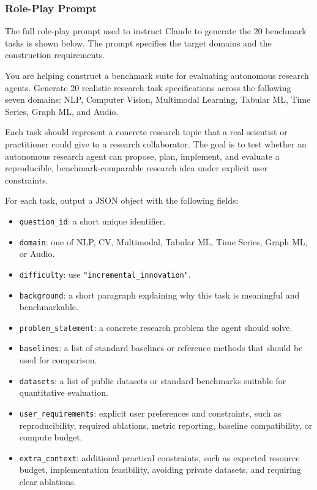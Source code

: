 \documentclass{opendatalab}
\begin{document}
\subsubsection{Role-Play Prompt}
\label{sec:benchmark_prompt}

The full role-play prompt used to instruct Claude to generate the 20
benchmark tasks is shown below. The prompt specifies the target
domains and the construction requirements.

\begin{tcolorbox}[
  breakable,
  colback=gray!5,
  colframe=black!60,
  boxrule=0.5pt,
  arc=2pt,
  left=6pt, right=6pt, top=6pt, bottom=6pt,
  title=\textbf{Role-play prompt for benchmark topic generation},
  fonttitle=\small\bfseries
]
\small
You are helping construct a benchmark suite for evaluating autonomous research agents. Generate 20 realistic research task specifications across the following seven domains: NLP, Computer Vision, Multimodal Learning, Tabular ML, Time Series, Graph ML, and Audio.

Each task should represent a concrete research topic that a real scientist or practitioner could give to a research collaborator. The goal is to test whether an autonomous research agent can propose, plan, implement, and evaluate a reproducible, benchmark-comparable research idea under explicit user constraints.

\medskip
For each task, output a JSON object with the following fields:
\begin{itemize}\setlength\itemsep{1pt}
  \item \texttt{question\_id}: a short unique identifier.
  \item \texttt{domain}: one of NLP, CV, Multimodal, Tabular ML, Time Series, Graph ML, or Audio.
  \item \texttt{difficulty}: use \texttt{"incremental\_innovation"}.
  \item \texttt{background}: a short paragraph explaining why this task is meaningful and benchmarkable.
  \item \texttt{problem\_statement}: a concrete research problem the agent should solve.
  \item \texttt{baselines}: a list of standard baselines or reference methods that should be used for comparison.
  \item \texttt{datasets}: a list of public datasets or standard benchmarks suitable for quantitative evaluation.
  \item \texttt{user\_requirements}: explicit user preferences and constraints, such as reproducibility, required ablations, metric reporting, baseline compatibility, or compute budget.
  \item \texttt{extra\_context}: additional practical constraints, such as expected resource budget, implementation feasibility, avoiding private datasets, and requiring clear ablations.
\end{itemize}


\end{tcolorbox}
\end{document}
